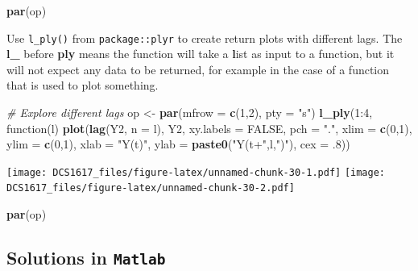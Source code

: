 \documentclass[]{book}
\newenvironment{Shaded}{\begin{snugshade}}{\end{snugshade}}
\newcommand{\KeywordTok}[1]{\textcolor[rgb]{0.13,0.29,0.53}{\textbf{{#1}}}}
\newcommand{\DataTypeTok}[1]{\textcolor[rgb]{0.13,0.29,0.53}{{#1}}}
\newcommand{\DecValTok}[1]{\textcolor[rgb]{0.00,0.00,0.81}{{#1}}}
\newcommand{\StringTok}[1]{\textcolor[rgb]{0.31,0.60,0.02}{{#1}}}
\newcommand{\CommentTok}[1]{\textcolor[rgb]{0.56,0.35,0.01}{\textit{{#1}}}}
\newcommand{\OtherTok}[1]{\textcolor[rgb]{0.56,0.35,0.01}{{#1}}}
\newcommand{\NormalTok}[1]{{#1}}
\begin{document}
\begin{Shaded}
\begin{Highlighting}[]
\KeywordTok{par}\NormalTok{(op)}
\end{Highlighting}
\end{Shaded}

Use \texttt{l\_ply()} from \texttt{package::plyr} to create return plots
with different lags. The \textbf{l\_} before \textbf{ply} means the
function will take a \textbf{l}ist as input to a function, but it will
not expect any data to be returned, for example in the case of a
function that is used to plot something.

\begin{Shaded}
\begin{Highlighting}[]
\CommentTok{# Explore different lags}
\NormalTok{op <-}\StringTok{ }\KeywordTok{par}\NormalTok{(}\DataTypeTok{mfrow =} \KeywordTok{c}\NormalTok{(}\DecValTok{1}\NormalTok{,}\DecValTok{2}\NormalTok{), }\DataTypeTok{pty =} \StringTok{"s"}\NormalTok{)}
\KeywordTok{l_ply}\NormalTok{(}\DecValTok{1}\NormalTok{:}\DecValTok{4}\NormalTok{, function(l) }\KeywordTok{plot}\NormalTok{(}\KeywordTok{lag}\NormalTok{(Y2, }\DataTypeTok{n =} \NormalTok{l), Y2, }\DataTypeTok{xy.labels =} \OtherTok{FALSE}\NormalTok{, }\DataTypeTok{pch =} \StringTok{"."}\NormalTok{, }\DataTypeTok{xlim =} \KeywordTok{c}\NormalTok{(}\DecValTok{0}\NormalTok{,}\DecValTok{1}\NormalTok{), }\DataTypeTok{ylim =} \KeywordTok{c}\NormalTok{(}\DecValTok{0}\NormalTok{,}\DecValTok{1}\NormalTok{), }\DataTypeTok{xlab =} \StringTok{"Y(t)"}\NormalTok{, }\DataTypeTok{ylab =} \KeywordTok{paste0}\NormalTok{(}\StringTok{"Y(t+"}\NormalTok{,l,}\StringTok{")"}\NormalTok{), }\DataTypeTok{cex =} \NormalTok{.}\DecValTok{8}\NormalTok{))}
\end{Highlighting}
\end{Shaded}

\texttt{[image: DCS1617\_files/figure-latex/unnamed-chunk-30-1.pdf]}
\texttt{[image: DCS1617\_files/figure-latex/unnamed-chunk-30-2.pdf]}

\begin{Shaded}
\begin{Highlighting}[]
\KeywordTok{par}\NormalTok{(op)}
\end{Highlighting}
\end{Shaded}

\subsection{\texorpdfstring{Solutions in
\texttt{Matlab}}{Solutions in Matlab}}\label{solutions-in-matlab}
\end{document}
